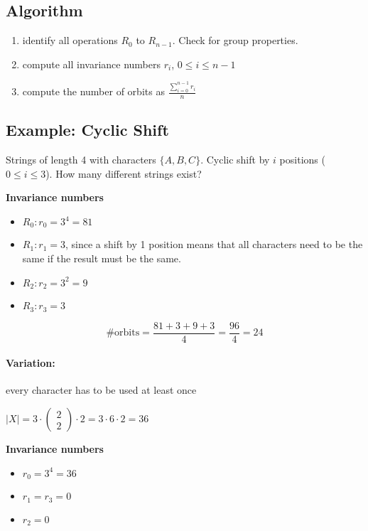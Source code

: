 \documentclass[11pt]{article}
\begin{document}
\subsection{Algorithm}

\begin{enumerate}
\item identify all operations $ R_0 $ to $ R_{n-1} $. Check for group properties.
\item compute all invariance numbers $ r_i $, $ 0 \leq i \leq n - 1 $
\item compute the number of orbits as $ \frac{\sum \limits_{i = 0}^{n - 1} r_i}{n} $
\end{enumerate}


\subsection{Example: Cyclic Shift}

Strings of length 4 with characters $ \{ A, B, C \} $. Cyclic shift by $ i $ positions ($ 0 \leq i \leq 3 $). How many different strings exist? \newline

\textbf{Invariance numbers}
\begin{itemize}
\item $ R_0: r_0 = 3^4 = 81 $
\item $ R_1: r_1 = 3 $, since a shift by 1 position means that all characters need to be the same if the result must be the same.
\item $ R_2: r_2 = 3^2 = 9 $
\item $ R_3: r_3 = 3 $
\end{itemize}

\[ \#\text{orbits} = \frac{81 + 3 + 9 + 3}{4} = \frac{96}{4} = 24 \]

\paragraph{Variation:} every character has to be used at least once \newline

$ | X | = 3 \cdot \begin{pmatrix} 2 \\ 2 \end{pmatrix} \cdot 2 = 3 \cdot 6 \cdot 2 = 36 $

\textbf{Invariance numbers}
\begin{itemize}
\item $ r_0 = 3^4 = 36 $
\item $ r_1 = r_3 = 0 $
\item $ r_2 = 0 $
\end{itemize}
\end{document}
